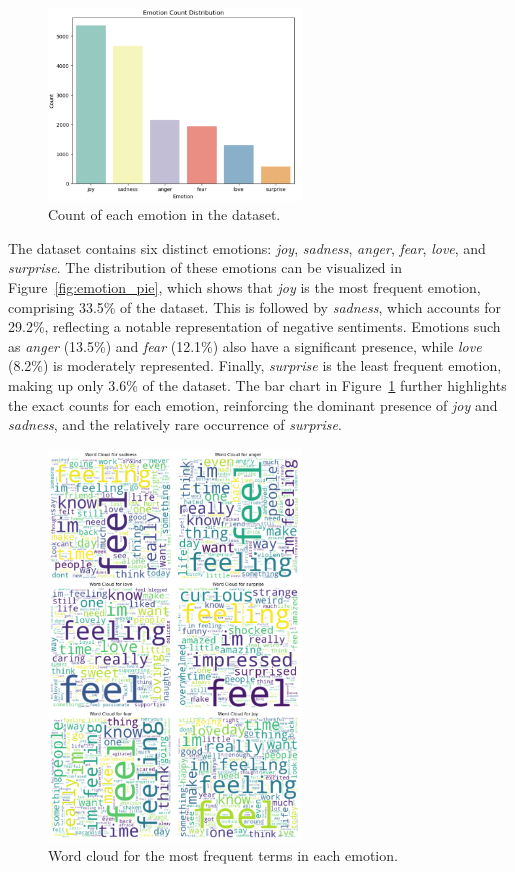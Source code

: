 \begin{figure}[H]
    \centering
    \includegraphics[width=0.6\textwidth]{emotion_bar.png}
    \caption{Count of each emotion in the dataset.}
    \label{fig:emotion_bar}
\end{figure}
The dataset contains six distinct emotions: \textit{joy}, \textit{sadness}, \textit{anger}, \textit{fear}, \textit{love}, and \textit{surprise}. The distribution of these emotions can be visualized in Figure~\ref{fig:emotion_pie}, which shows that \textit{joy} is the most frequent emotion, comprising 33.5\% of the dataset. This is followed by \textit{sadness}, which accounts for 29.2\%, reflecting a notable representation of negative sentiments. Emotions such as \textit{anger} (13.5\%) and \textit{fear} (12.1\%) also have a significant presence, while \textit{love} (8.2\%) is moderately represented. Finally, \textit{surprise} is the least frequent emotion, making up only 3.6\% of the dataset. The bar chart in Figure~\ref{fig:emotion_bar} further highlights the exact counts for each emotion, reinforcing the dominant presence of \textit{joy} and \textit{sadness}, and the relatively rare occurrence of \textit{surprise}.

\begin{figure}[H]
    \centering
    \includegraphics[width=0.6\textwidth]{emotion_cloud.png}
    \caption{Word cloud for the most frequent terms in each emotion.}
    \label{fig:emotion_cloud}
\end{figure}

